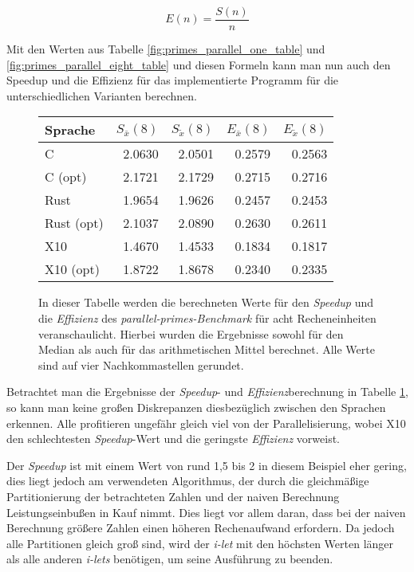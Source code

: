 \begin{equation}
	\label{formula:effizienz}
	E(n) = \frac{S(n)}{n}
\end{equation}

Mit den Werten aus Tabelle \ref{fig:primes_parallel_one_table} und \ref{fig:primes_parallel_eight_table} und diesen
Formeln kann man nun auch den Speedup und die Effizienz für das implementierte Programm für die unterschiedlichen
Varianten berechnen.

\begin{figure}[hb]
	\begin{center}
		\begin{tabular}{lrrrr}
			\toprule
			Sprache & $S_{\bar{x}}(8)$ & $S_{\tilde{x}}(8)$ & $E_{\bar{x}}(8)$ & $E_{\tilde{x}}(8)$ \\
			\midrule
			C          & 2.0630 & 2.0501 & 0.2579 & 0.2563 \\
			C (opt)    & 2.1721 & 2.1729 & 0.2715 & 0.2716 \\
			Rust       & 1.9654 & 1.9626 & 0.2457 & 0.2453 \\
			Rust (opt) & 2.1037 & 2.0890 & 0.2630 & 0.2611 \\
			X10        & 1.4670 & 1.4533 & 0.1834 & 0.1817 \\
			X10 (opt)  & 1.8722 & 1.8678 & 0.2340 & 0.2335 \\
			\bottomrule
		\end{tabular}
	\end{center}
	\caption{
		In dieser Tabelle werden die berechneten Werte für den \textit{Speedup} und die \textit{Effizienz}
		des \textit{parallel-primes-Benchmark} für acht Recheneinheiten veranschaulicht.
		Hierbei wurden die Ergebnisse sowohl für den
		Median als auch für das arithmetischen Mittel berechnet. Alle Werte sind auf vier Nachkommastellen gerundet.
	}
	\label{fig:primes_parallel_speedup_efficiency_table}
\end{figure}

Betrachtet man die Ergebnisse der \textit{Speedup}- und \textit{Effizienz}berechnung in Tabelle
\ref{fig:primes_parallel_speedup_efficiency_table}, so kann man keine großen Diskrepanzen 
diesbezüglich zwischen den Sprachen erkennen. Alle profitieren ungefähr gleich viel von der Parallelisierung,
wobei X10 den schlechtesten \textit{Speedup}-Wert und die geringste \textit{Effizienz} vorweist.

Der \textit{Speedup} ist mit einem Wert von rund 1,5 bis 2 in diesem Beispiel eher gering,
dies liegt jedoch am verwendeten Algorithmus,
der durch die gleichmäßige Partitionierung der betrachteten Zahlen und der naiven Berechnung
Leistungseinbußen in Kauf nimmt. Dies liegt vor allem daran, dass bei der naiven Berechnung größere Zahlen
einen höheren Rechenaufwand erfordern. Da jedoch alle Partitionen gleich groß sind, wird der \textit{i-let} mit
den höchsten Werten länger als alle anderen \textit{i-lets} benötigen, um seine Ausführung zu beenden.

